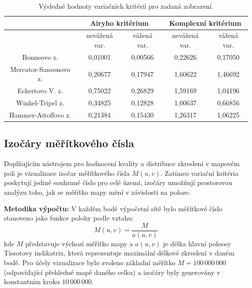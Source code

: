\begin{table}[h!]
	\centering
	\begin{tabular}{|c||c|c|c|c|}
		\hline
		& \multicolumn{2}{c|}{Airyho kritérium} & \multicolumn{2}{c|}{Komplexní kritérium} \\
		\hline
		& nevážená var. & vážená var. & nevážená var. & vážená var. \\
		\hline \hline
		Bonneovo z. & 0,01001 & 0,00566 & 0,22626 & 0,17050 \\
		\hline
		Mercator-Sansonovo z. & 0,20677 & 0,17947 & 1,60622 & 1,46692 \\
		\hline
		Eckertovo V. z. & 0,75022 & 0,26829 & 1,59169 & 1,04196 \\
		\hline
		Winkel-Tripel z. & 0,34825 & 0,12828 & 1,00637 & 0,66856 \\
		\hline
		Hammer-Aitoffovo z. & 0,21384 & 0,15430 & 1,26317 & 1,06225 \\
		\hline
	\end{tabular}
	\caption{Výsledné hodnoty variačních kritérií pro zadaná zobrazení.}
	\label{tab1}
\end{table}

\newpage
\subsection*{Izočáry měřítkového čísla}
Doplňujícím nástrojem pro hodnocení kvality a distribuce zkreslení v mapovém poli je vizualizace izočar měřítkového čísla $M(u,v)$. 
Zatímco variační kritéria poskytují jediné souhrnné číslo pro celé území, izočáry umožňují prostorovou analýzu toho, jak se měřítko mapy mění v závislosti na poloze. 

\textbf{Metodika výpočtu:}
V každém bodě výpočetní sítě bylo měřítkové číslo stanoveno jako funkce polohy podle vztahu: $$M(u,v) = \frac{M}{a(u,v)}$$ kde $M$ představuje výchozí měřítko mapy a $a(u,v)$ je délka hlavní poloosy Tissotovy indikatrix, která reprezentuje maximální délkové zkreslení v daném bodě. 
Pro účely vizualizace bylo zvoleno základní měřítko $M = 100\,000\,000$ (odpovídající přehledné mapě daného celku) a izočáry byly generovány v konstantním kroku $10\,000\,000$.

